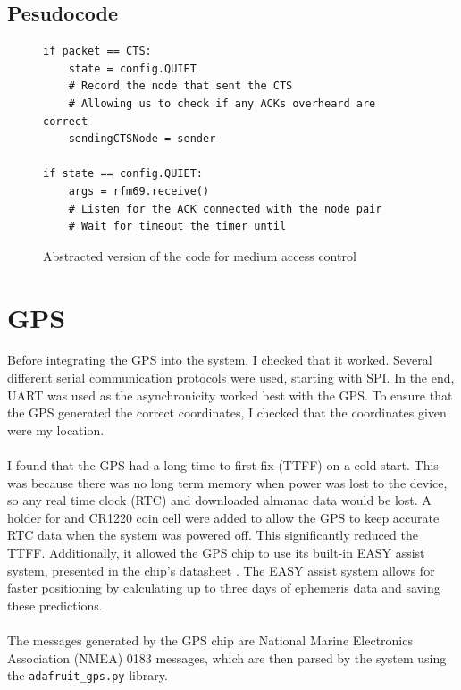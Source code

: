 \documentclass[12pt,a4paper]{report}
\begin{document}
\subsection{Pesudocode}
\begin{figure}[h]
\begin{verbatim}
if packet == CTS:
    state = config.QUIET
    # Record the node that sent the CTS 
    # Allowing us to check if any ACKs overheard are correct 
    sendingCTSNode = sender

if state == config.QUIET:
    args = rfm69.receive()
    # Listen for the ACK connected with the node pair
    # Wait for timeout the timer until 
\end{verbatim}
\caption{Abstracted version of the code for medium access control}
\end{figure}



\section{GPS} 
Before integrating the GPS into the system, I checked that it worked. Several different serial communication protocols were used, starting with SPI. In the end, UART was used as the asynchronicity worked best with the GPS. To ensure that the GPS generated the correct coordinates, I checked that the coordinates given were my location. \\ \\ 
I found that the GPS had a long time to first fix (TTFF) on a cold start. This was because there was no long term memory when power was lost to the device, so any real time clock (RTC) and downloaded almanac data would be lost. A holder for and CR1220 coin cell were added to allow the GPS to keep accurate RTC data when the system was powered off. This significantly reduced the TTFF. Additionally, it allowed the GPS chip to use its built-in EASY assist system, presented in the chip's datasheet \cite{gpsdata}. The EASY assist system allows for faster positioning by calculating up to three days of ephemeris data and saving these predictions. \\ \\
The messages generated by the GPS chip are National Marine Electronics Association (NMEA) 0183 messages, which are then parsed by the system using the \verb'adafruit_gps.py' library. \\
\end{document}
